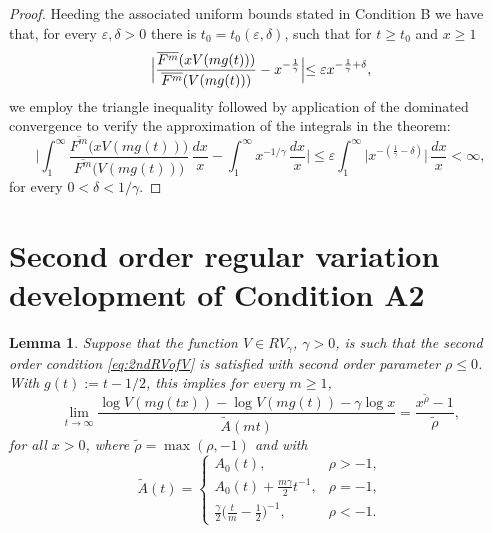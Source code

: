 \documentclass[11pt, a4paper, oneside]{article}
\numberwithin{equation}{section}
\theoremstyle{plain}
\newtheorem{lem}[thm]{Lemma}
\theoremstyle{definition}
\newcommand{\limit}[1]{\ensuremath{\displaystyle {\lim_{#1 \rightarrow{\infty}}}}}
\begin{document}
\begin{proof}
	Heeding the associated uniform bounds stated in Condition B we have that, for every $\varepsilon,\delta>0$ there is $t_0= t_0(\varepsilon,\delta)$, such that for $t\geq t_0$ and $x\geq 1$
\begin{equation*}
    \Bigl|\frac{\overline{F^{m}}(xV(mg(t)))}{\overline{F^{m}}(V(mg(t)))}-x^{-\frac{1}{\gamma}}\Bigl| \leq \varepsilon x^{-\frac{1}{\gamma}+\delta},
\end{equation*}
we employ the triangle inequality followed by application of the dominated convergence to verify the approximation of the integrals in the theorem:
\begin{equation*}
    \biggl| \int_1^{\infty} \frac{\overline{F^{m}}\bigl( x V(m g(t)) \bigr) }{ \overline{F^{m}} \bigl( V(m g(t)) \bigr)}\, \frac{dx}{x} - \int_1^{\infty} x^{-1/\gamma} \, \frac{dx}{x} \biggr| \leq  \varepsilon \int_1^{\infty} \bigl| x^{-(\frac{1}{\gamma}-\delta)}\bigr|  \, \frac{dx}{x} < \infty,
\end{equation*}
for every $0<\delta< 1/\gamma $.
\end{proof}



\section{Second order regular variation development of Condition A2}\label{App:CondB2}
\begin{lem}\label{Lem:2ndOrdLogShift}
Suppose that the function $V\in RV_{\gamma}$, $\gamma>0$, is such that the second order condition \eqref{eq:2ndRVofV} is satisfied with second order parameter $\rho \leq 0$. With $g(t):=t-1/2$, this implies for every $m\geq 1$,
\begin{equation*}
 \limit{t} \frac{\log V(mg(tx))-\log V(mg(t))-\gamma\log x}{\tilde{A}(mt)}= 
 \frac{x^{\tilde{\rho}}-1}{\tilde{\rho}},
\end{equation*}
for all $x>0$, where $\tilde{\rho} = \max(\rho, -1)$ and with
\begin{equation*}
 \tilde{A}(t)=\begin{cases}
A_{0}(t), & \rho > -1, \\
A_{0}(t) +\frac{m\gamma}{2}{t}^{-1}, &\rho=-1,\\
\frac{\gamma}{2} \bigl(\frac{t}{m}-\frac{1}{2} \bigr)^{-1}, & \rho < -1.
\end{cases} 
\end{equation*}
\end{lem}
\end{document}
